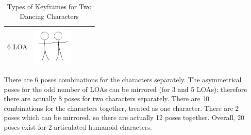 \documentclass[12pt, a4paper]{memoir}
\begin{document}
\begin{table}[!htb]
\begin{tabular}{ | c | c || c | c | c | }
\begin{minipage}{.15\textwidth}
    \end{minipage} & & 
    \\ \hline
    6 LOA 
    &
    \begin{minipage}{.15\textwidth}
      \includegraphics[width=\linewidth, height=20mm]{img/6loa_separate_keyframe}
    \end{minipage}
    & & & 
    \\ \hline
  \end{tabular}
  \caption{Types of Keyframes for Two Dancing Characters}
  \label{LOAChart}
\end{table}

\newpage
There are 6 poses combinations for the characters separately. The asymmetrical poses for the odd number of LOAs can be mirrored (for 3 and 5 LOAs); therefore there are actually 8 poses for two characters separately. There are 10 combinations for the characters together, treated as one character. There are 2 poses which can be mirrored, so there are actually 12 poses together. Overall, 20 poses exist for 2 articulated humanoid characters.

\backmatter

 
\nocite{*}

\end{document}
